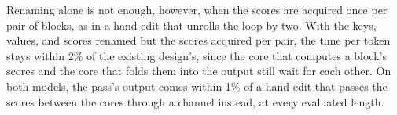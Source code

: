 Renaming alone is not enough, however, when the scores are acquired once per pair of blocks, as in a hand edit that unrolls the loop by two.
With the keys, values, and scores renamed but the scores acquired per pair, the time per token stays within 2\% of the existing design's, since the core that computes a block's scores and the core that folds them into the output still wait for each other.
On both models, the pass's output comes within 1\% of a hand edit that passes the scores between the cores through a channel instead, at every evaluated length.

